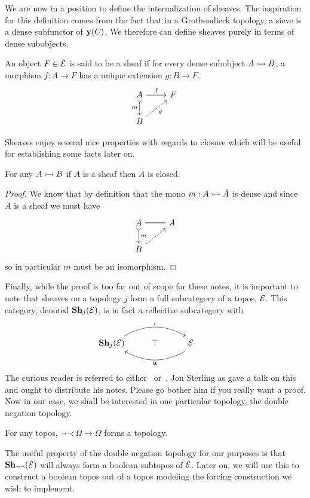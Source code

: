 We are now in a position to define the internalization of sheaves. The
inspiration for this definition comes from the fact that in a
Grothendieck topology, a sieve is a dense subfunctor of
$\yoneda(C)$. We therefore can define sheaves purely in terms of dense
subobjects.

\begin{defn}\label{defn:background:sheaves}
  An object $F \in \Etop$ is said to be a sheaf if for every dense
  subobject $A \mono B$, a morphism $f : A \to F$ has a unique
  extension $g : B \to F$.
  \[
    \begin{tikzcd}
      A \ar[d, rightarrowtail, swap, "m"] \ar[r, "f"] & F\\
      B \ar[ur, dashed, swap, "g"]
    \end{tikzcd}
  \]
\end{defn}

Sheaves enjoy several nice properties with regards to closure which
will be useful for establishing some facts later on.
\begin{lem}\label{lem:background:sheavesclosed}
  For any $A \mono B$ if $A$ is a sheaf then $A$ is closed.
\end{lem}
\begin{proof}
  We know that by definition that the mono $m : A \mono \bar{A}$ is
  dense and since $A$ is a sheaf we must have
  \[
    \begin{tikzcd}
      A \ar[d, rightarrowtail, "m"] \ar[r, equals] & A\\
      B \ar[ur, dashed]
    \end{tikzcd}
  \]
  so in particular $m$ must be an isomorphism.
\end{proof}

Finally, while the proof is too far out of scope for these notes, it
is important to note that sheaves on a topology $j$ form a full
subcategory of a topos, $\Etop$. This category, denoted
$\sheaves[j]{\Etop}$, is in fact a reflective subcategory with
\[
  \begin{tikzcd}
    \sheaves[j]{\Etop} \ar[rr, bend left, "\iota"] & \top &
    \makebox[0pt]{\phantom{\textbf{Sh}}$\Etop$}\phantom{\sheaves[j]{\Etop}}
    \ar[ll, bend left, "\sheafify"]
  \end{tikzcd}
\]
The curious reader is referred to either~\citet{MacLane:92}
or~\citet{Johnstone:14}. Jon Sterling as gave a talk on this and ought
to distribute his notes. Please go bother him if you really want a
proof. Now in our case, we shall be interested in one particular
topology, the double negation topology.
\begin{example}\label{ex:background:doublenegation}
  For any topos, $\neg\neg : \Omega \to \Omega$ forms a topology.
\end{example}
The useful property of the double-negation topology for our purposes
is that $\sheaves[\neg\neg]{\Etop}$ will always form a boolean
subtopos of $\Etop$. Later on, we will use this to construct a boolean
topos out of a topos modeling the forcing construction we wish to
implement.

